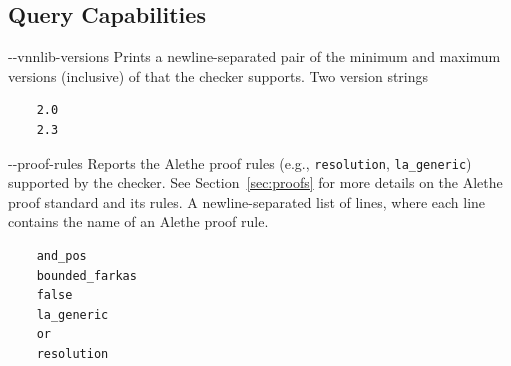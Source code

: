 \subsection{\vnnlib{} Query Capabilities}

\clOutputOption
{-{}-vnnlib-versions}
{Prints a newline-separated pair of the minimum and maximum versions (inclusive) of \vnnlib{} that the checker supports.}
{Two version strings}
\begin{lstlisting}[style=bash]
	%*\exampleChecker* supports --vnnlib-versions
	2.0
	2.3
\end{lstlisting}


\clOutputOption
{-{}-proof-rules}
{Reports the Alethe proof rules (e.g., \texttt{resolution}, \texttt{la\_generic}) supported by the checker. See Section~\ref{sec:proofs} for more details on the Alethe proof standard and its rules.
}
{A newline-separated list of lines, where each line contains the name of an Alethe proof rule.}
\begin{lstlisting}[style=bash]
	%*\exampleChecker* supports --proof-rules
	and_pos
	bounded_farkas
	false
	la_generic
	or
	resolution
\end{lstlisting}
